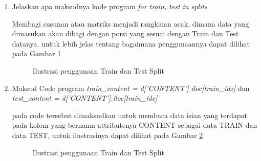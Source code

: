 \begin{enumerate}
\item Jelaskan apa maksudnya kode program \emph{for train, test in splits}
\par Membagi susunan atau matriks menjadi rangkaian acak, dimana data yang dimasukan akan dibagi dengan porsi yang sesuai dengan Train dan Test datanya. untuk lebih jelas tentang bagaimana penggunaannya dapat dilihat pada Gambar \ref{data3}

\begin{figure}[!htbp]
      \caption{Ilustrasi  penggunaan Train dan Test Split}
      \label{data3}
\end{figure}

\item Maksud Code program \emph{train\_content = d['CONTENT'].iloc[train\_idx]} dan \emph{test\_content = d['CONTENT'].iloc[train\_idx]}
\par pada code tersebut dimaksudkan untuk membaca data isian yang terdapat pada kolom yang bernama attributenya CONTENT sebagai data TRAIN dan data TEST, untuk ilustrasinya dapat dilihat pada Gambar \ref{data4}

\begin{figure}[!htbp]
      \caption{Ilustrasi  penggunaan Train dan Test Split}
      \label{data4}
\end{figure}


\end{enumerate}
